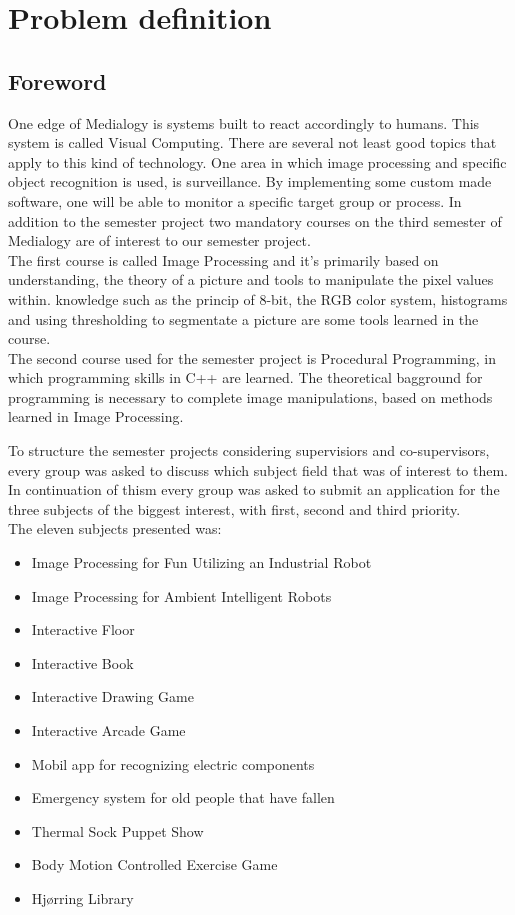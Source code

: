 \chapter{Problem definition}
\section{Foreword}
One edge of Medialogy is systems built to react accordingly to humans. This system is called Visual Computing. There are several not least good topics that apply to this kind of technology. One area in which image processing and specific object recognition is used, is surveillance. By implementing some custom made software, one will be able to monitor a specific target group or process. In addition to the semester project two mandatory courses on the third semester of Medialogy are of interest to our semester project.\\
The first course is called Image Processing and it's primarily based on understanding, the theory of a picture and tools to manipulate the pixel values within. knowledge such as the princip of 8-bit, the RGB color system, histograms and using thresholding to segmentate a picture are some tools learned in the course.\\
The second course used for the semester project is Procedural Programming, in which programming skills in C++ are learned. The theoretical bagground for programming is necessary to complete image manipulations, based on methods learned in Image Processing.

To structure the semester projects considering supervisiors and co-supervisors, every group was asked to discuss which subject field that was of interest to them. In continuation of thism every group was asked to submit an application for the three subjects of the biggest interest, with first, second and third priority.\\
The eleven subjects presented was:

\begin{itemize}
\item Image Processing for Fun Utilizing an Industrial Robot
\item Image Processing for Ambient Intelligent Robots
\item Interactive Floor
\item Interactive Book
\item Interactive Drawing Game
\item Interactive Arcade Game
\item Mobil app for recognizing electric components
\item Emergency system for old people that have fallen
\item Thermal Sock Puppet Show
\item Body Motion Controlled Exercise Game
\item Hjørring Library
\end{itemize}

